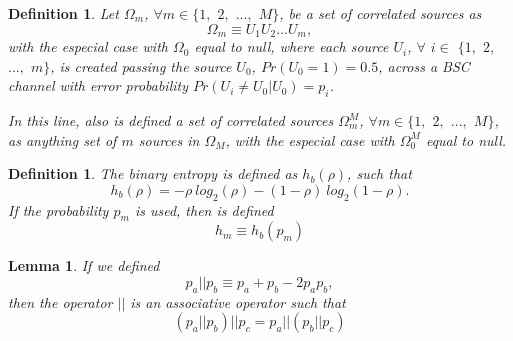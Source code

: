 \documentclass[a4paper,10pt]{article}
\newtheorem{definition}[mytheorem]{Definition}
\newtheorem{mylemma}[mytheorem]{Lemma}
\begin{document}
\begin{mdframed}[style=MDFStyGrayScreen]
\begin{definition}
 \label{def:omega}
Let $\Omega_m$, $\forall m \in \{1,$ $2,$ $...,$ $M\}$, be a set of correlated 
sources as
\begin{equation}
\label{eq:omega}
 \Omega_m \equiv U_1 U_2 ... U_m,
\end{equation}
with the especial case with $\Omega_0$ equal to null,
where each source $U_i$, $\forall$ $i \in$ $\{1,$ $2,$ $...,$ $m\}$, is created 
passing the source $U_0$, $Pr(U_0=1)=0.5$, across a BSC channel  with error 
probability $Pr(U_i \ne U_0 | U_0)=p_i$.

In this line, also is defined a set of correlated sources $\Omega^{M}_m$, 
$\forall m \in \{1,$ $2,$ $...,$ $M\}$, as anything set of $m$  sources in $\Omega_M$, 
with the especial case with $\Omega^M_0$ equal to null.
\end{definition}
\end{mdframed}
\begin{mdframed}[style=MDFStyGrayScreen]
\begin{definition}
 \label{def:hb}
The binary entropy is defined as $h_{b}(\rho)$, such that
\begin{equation}
\label{eq:hb1}
h_{b}(\rho)=- \rho ~ log_2(\rho) - (1-\rho) ~ log_2(1-\rho).
\end{equation}
If the probability $p_m$ is used, then is defined
\begin{equation}
\label{eq:hi}
h_m \equiv h_{b}(p_m)
\end{equation}
\end{definition}
\end{mdframed}
\begin{mdframed}[style=MDFStyGrayScreen]
\begin{mylemma}
\label{lemma:def} 
If we defined 
\begin{equation} \label{eq:ab2}
 p_a || p_b \equiv p_a + p_b -2 p_a p_b, 
\end{equation} 
then the operator $||$ is an associative operator such that
\begin{equation} \label{eq:def1}
 (p_a || p_b)||p_c = p_a || (p_b||p_c)
\end{equation} 
\end{mylemma}
\end{mdframed}
\end{document}
